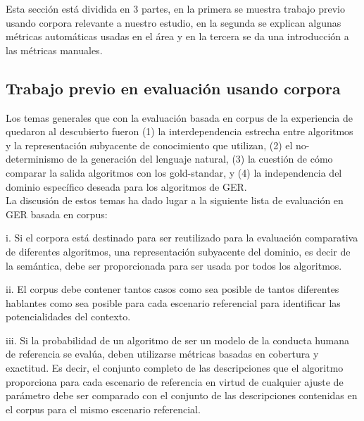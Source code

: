 Esta secci\'on est\'a dividida en 3 partes, en la primera se muestra trabajo previo usando corpora relevante a nuestro estudio, en la segunda se explican algunas m\'etricas autom\'aticas usadas en el \'area y en la tercera se da una introducci\'on a las m\'etricas manuales.

\subsection{Trabajo previo en evaluaci\'on usando corpora}\label{sec:2_3_1}

Los temas generales que con la evaluaci\'on basada en corpus de la experiencia de \cite{viet:gene11} quedaron
al descubierto fueron (1) la interdependencia estrecha entre algoritmos y la
representaci\'on subyacente de conocimiento que utilizan, (2) el no-determinismo de la generaci\'on del lenguaje natural, 
(3) la cuesti\'on de c\'omo comparar la salida algoritmos con los gold-standar, y (4) la independencia del dominio espec\'ifico deseada para los algoritmos de GER.\\
La discusi\'on de estos temas ha dado lugar a la siguiente lista de evaluaci\'on en GER basada en corpus:

i. Si el corpora est\'a destinado para ser reutilizado para la evaluaci\'on comparativa de diferentes
algoritmos, una representaci\'on subyacente del dominio, es decir de la sem\'antica, debe ser proporcionada para ser usada por todos los algoritmos.

ii. El corpus debe contener tantos casos como sea posible de tantos diferentes hablantes como sea posible para cada escenario referencial para identificar las potencialidades del contexto. 

iii. Si la probabilidad de un algoritmo de ser un modelo de la conducta humana de referencia
se eval\'ua, deben utilizarse m\'etricas basadas en cobertura y exactitud. Es decir, el conjunto completo de las descripciones que el algoritmo proporciona para cada
escenario de referencia en virtud de cualquier ajuste de par\'ametro debe ser comparado con el
conjunto de las descripciones contenidas en el corpus para el mismo escenario referencial.

